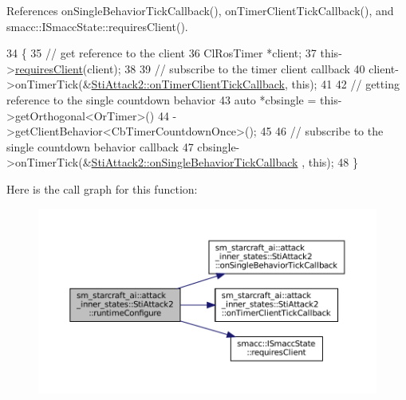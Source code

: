 References on\+Single\+Behavior\+Tick\+Callback(), on\+Timer\+Client\+Tick\+Callback(), and smacc\+::\+I\+Smacc\+State\+::requires\+Client().


\begin{DoxyCode}
34   \{
35     \textcolor{comment}{// get reference to the client}
36     ClRosTimer *client;
37     this->\hyperlink{classsmacc_1_1ISmaccState_a7f95c9f0a6ea2d6f18d1aec0519de4ac}{requiresClient}(client);
38 
39     \textcolor{comment}{// subscribe to the timer client callback}
40     client->onTimerTick(&\hyperlink{structsm__starcraft__ai_1_1attack__inner__states_1_1StiAttack2_ab61b51291174e84b4ebf137101703e65}{StiAttack2::onTimerClientTickCallback}, \textcolor{keyword}{this});
41 
42     \textcolor{comment}{// getting reference to the single countdown behavior}
43     \textcolor{keyword}{auto} *cbsingle = this->getOrthogonal<OrTimer>()
44                          ->getClientBehavior<CbTimerCountdownOnce>();
45 
46     \textcolor{comment}{// subscribe to the single countdown behavior callback}
47     cbsingle->onTimerTick(&\hyperlink{structsm__starcraft__ai_1_1attack__inner__states_1_1StiAttack2_a3a78121d979d8bb7eb466707456a1aef}{StiAttack2::onSingleBehaviorTickCallback}
      , \textcolor{keyword}{this});
48   \}
\end{DoxyCode}
Here is the call graph for this function\+:
\nopagebreak
\begin{figure}[H]
\begin{center}
\leavevmode
\includegraphics[width=350pt]{structsm__starcraft__ai_1_1attack__inner__states_1_1StiAttack2_a301b74115e7af337d1f3883eb800a7a6_cgraph}
\end{center}
\end{figure}
\mbox{\label{structsm__starcraft__ai_1_1attack__inner__states_1_1StiAttack2_ab86bb635738bb7d4d85d663203c8c2d9}} 

